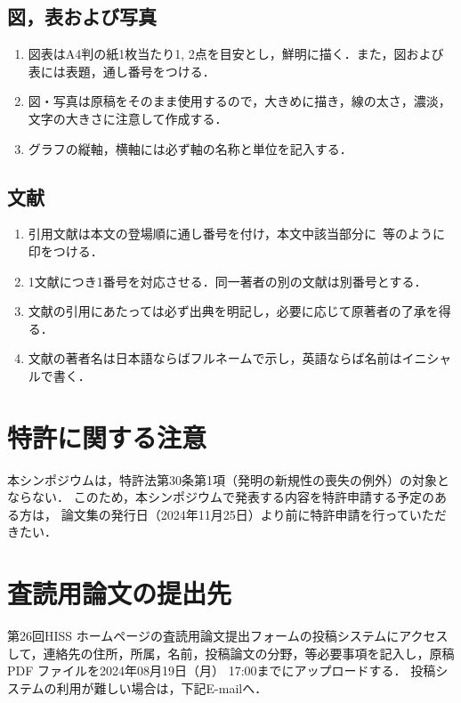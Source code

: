 \documentclass[a4j,twocolumn,10pt]{jarticle}
\begin{document}
\subsection{図，表および写真}
\begin{enumerate}
\item 図表はA4判の紙1枚当たり1, 2点を目安とし，鮮明に描く．また，図および表には表題，通し番号をつける．
\vspace{-2mm}
\item 図・写真は原稿をそのまま使用するので，大きめに描き，線の太さ，濃淡，文字の大きさに注意して作成する．
\vspace{-2mm}
\item グラフの縦軸，横軸には必ず軸の名称と単位を記入する．
\end{enumerate}
\vspace{-3mm}
\subsection{文献}
\begin{enumerate}
\item 引用文献は本文の登場順に通し番号を付け，本文中該当部分に~\cite{b1}等のように印をつける．
\vspace{-2mm}
\item 1文献につき1番号を対応させる．同一著者の別の文献は別番号とする．
\vspace{-2mm}
\item 文献の引用にあたっては必ず出典を明記し，必要に応じて原著者の了承を得る．
\vspace{-2mm}
\item 文献の著者名は日本語ならばフルネームで示し，英語ならば名前はイニシャルで書く．
\end{enumerate}
\vspace{-3mm}
\section{特許に関する注意}
本シンポジウムは，特許法第30条第1項（発明の新規性の喪失の例外）の対象とならない．
このため，本シンポジウムで発表する内容を特許申請する予定のある方は，
論文集の発行日（2024年11月25日）より前に特許申請を行っていただきたい．

\section{査読用論文の提出先}
第26回HISS ホームページの査読用論文提出フォームの投稿システムにアクセスして，連絡先の住所，所属，名前，投稿論文の分野，等必要事項を記入し，原稿PDF ファイルを2024年08月19日（月） 17:00までにアップロードする．
投稿システムの利用が難しい場合は，下記E-mailへ．\\
\end{document}
